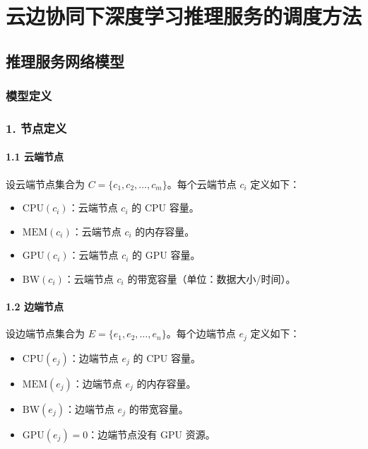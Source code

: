 
\chapter{云边协同下深度学习推理服务的调度方法}

\section{推理服务网络模型}

\subsection{模型定义}

\subsection*{1. 节点定义}

\subsubsection*{1.1 云端节点}
设云端节点集合为 \( C = \{c_1, c_2, \dots, c_m\} \)。每个云端节点 \( c_i \) 定义如下：
\begin{itemize}
    \item \(\text{CPU}(c_i)\)：云端节点 \( c_i \) 的 CPU 容量。
    \item \(\text{MEM}(c_i)\)：云端节点 \( c_i \) 的内存容量。
    \item \(\text{GPU}(c_i)\)：云端节点 \( c_i \) 的 GPU 容量。
    \item \(\text{BW}(c_i)\)：云端节点 \( c_i \) 的带宽容量（单位：数据大小/时间）。
\end{itemize}

\subsubsection*{1.2 边端节点}
设边端节点集合为 \( E = \{e_1, e_2, \dots, e_n\} \)。每个边端节点 \( e_j \) 定义如下：
\begin{itemize}
    \item \(\text{CPU}(e_j)\)：边端节点 \( e_j \) 的 CPU 容量。
    \item \(\text{MEM}(e_j)\)：边端节点 \( e_j \) 的内存容量。
    \item \(\text{BW}(e_j)\)：边端节点 \( e_j \) 的带宽容量。
    \item \(\text{GPU}(e_j) = 0\)：边端节点没有 GPU 资源。
\end{itemize}

